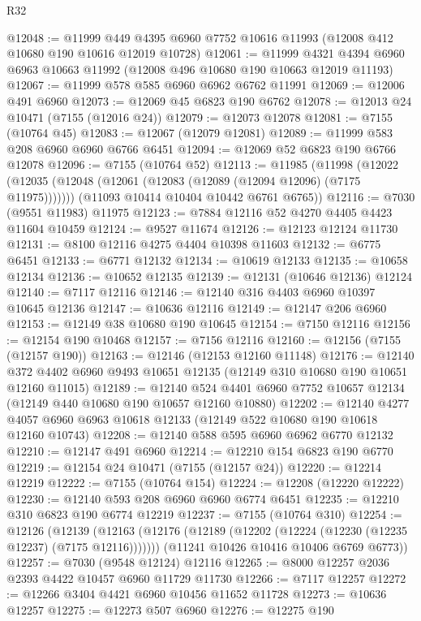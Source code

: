 \begin{lexlean}{R32}
\begin{coremodule}
@12048 := @11999 @449 @4395 @6960 @7752 @10616 @11993 (@12008 @412 @10680 @190 @10616 @12019 @10728)
@12061 := @11999
    @4321
    @4394
    @6960
    @6963
    @10663
    @11992
    (@12008 @496 @10680 @190 @10663 @12019 @11193)
@12067 := @11999 @578 @585 @6960 @6962 @6762 @11991
@12069 := @12006 @491 @6960
@12073 := @12069 @45 @6823 @190 @6762
@12078 := @12013 @24 @10471 (@7155 (@12016 @24))
@12079 := @12073 @12078
@12081 := @7155 (@10764 @45)
@12083 := @12067 (@12079 @12081)
@12089 := @11999 @583 @208 @6960 @6960 @6766 @6451
@12094 := @12069 @52 @6823 @190 @6766 @12078
@12096 := @7155 (@10764 @52)
@12113 := @11985
    (@11998
      (@12022 (@12035 (@12048 (@12061 (@12083 (@12089 (@12094 @12096) (@7175 @11975)))))))
      (@11093 @10414 @10404 @10442 @6761 @6765))
@12116 := @7030 (@9551 @11983) @11975
@12123 := @7884 @12116 @52 @4270 @4405 @4423 @11604 @10459
@12124 := @9527 @11674
@12126 := @12123 @12124 @11730
@12131 := @8100 @12116 @4275 @4404 @10398 @11603
@12132 := @6775 @6451
@12133 := @6771 @12132
@12134 := @10619 @12133
@12135 := @10658 @12134
@12136 := @10652 @12135
@12139 := @12131 (@10646 @12136) @12124
@12140 := @7117 @12116
@12146 := @12140 @316 @4403 @6960 @10397 @10645 @12136
@12147 := @10636 @12116
@12149 := @12147 @206 @6960
@12153 := @12149 @38 @10680 @190 @10645
@12154 := @7150 @12116
@12156 := @12154 @190 @10468
@12157 := @7156 @12116
@12160 := @12156 (@7155 (@12157 @190))
@12163 := @12146 (@12153 @12160 @11148)
@12176 := @12140 @372 @4402 @6960 @9493 @10651 @12135 (@12149 @310 @10680 @190 @10651 @12160 @11015)
@12189 := @12140 @524 @4401 @6960 @7752 @10657 @12134 (@12149 @440 @10680 @190 @10657 @12160 @10880)
@12202 := @12140
    @4277
    @4057
    @6960
    @6963
    @10618
    @12133
    (@12149 @522 @10680 @190 @10618 @12160 @10743)
@12208 := @12140 @588 @595 @6960 @6962 @6770 @12132
@12210 := @12147 @491 @6960
@12214 := @12210 @154 @6823 @190 @6770
@12219 := @12154 @24 @10471 (@7155 (@12157 @24))
@12220 := @12214 @12219
@12222 := @7155 (@10764 @154)
@12224 := @12208 (@12220 @12222)
@12230 := @12140 @593 @208 @6960 @6960 @6774 @6451
@12235 := @12210 @310 @6823 @190 @6774 @12219
@12237 := @7155 (@10764 @310)
@12254 := @12126
    (@12139
      (@12163 (@12176 (@12189 (@12202 (@12224 (@12230 (@12235 @12237) (@7175 @12116)))))))
      (@11241 @10426 @10416 @10406 @6769 @6773))
@12257 := @7030 (@9548 @12124) @12116
@12265 := @8000 @12257 @2036 @2393 @4422 @10457 @6960 @11729 @11730
@12266 := @7117 @12257
@12272 := @12266 @3404 @4421 @6960 @10456 @11652 @11728
@12273 := @10636 @12257
@12275 := @12273 @507 @6960
@12276 := @12275 @190

\end{coremodule}
\end{lexlean}
